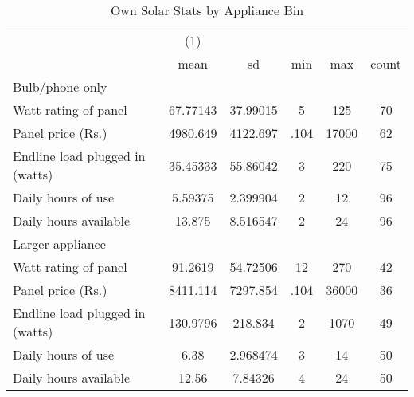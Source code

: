 \begin{table}[htbp]\centering
\def\sym#1{\ifmmode^{#1}\else\(^{#1}\)\fi}
\caption{Own Solar Stats by Appliance Bin\label {tab1}}
\begin{tabular}{l*{1}{ccccc}}
\toprule
                    &\multicolumn{1}{c}{(1)}&            &            &            &            \\
                    &        mean&          sd&         min&         max&       count\\
\midrule
Bulb/phone only     &            &            &            &            &            \\
Watt rating of panel&    67.77143&    37.99015&           5&         125&          70\\
Panel price (Rs.)   &    4980.649&    4122.697&        .104&       17000&          62\\
Endline load plugged in (watts)&    35.45333&    55.86042&           3&         220&          75\\
Daily hours of use  &     5.59375&    2.399904&           2&          12&          96\\
Daily hours available&      13.875&    8.516547&           2&          24&          96\\
\midrule
Larger appliance    &            &            &            &            &            \\
Watt rating of panel&     91.2619&    54.72506&          12&         270&          42\\
Panel price (Rs.)   &    8411.114&    7297.854&        .104&       36000&          36\\
Endline load plugged in (watts)&    130.9796&     218.834&           2&        1070&          49\\
Daily hours of use  &        6.38&    2.968474&           3&          14&          50\\
Daily hours available&       12.56&     7.84326&           4&          24&          50\\
\bottomrule
\end{tabular}
\end{table}

